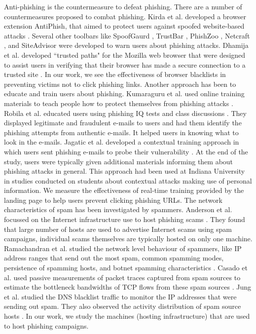 \documentclass[conference]{IEEEtran}
\begin{document}
\newline \indent
Anti-phishing is the countermeasure to defeat phishing. There are a number of countermeasures proposed to combat phishing. Kirda et al. developed a browser extension AntiPhish, that aimed to protect users against spoofed website-based attacks \cite{kirda}. Several other toolbars like SpoofGaurd \cite{chou}, TrustBar  \cite{herzberg}, PhishZoo \cite{afroz}, Netcraft \cite{netcraft}, and SiteAdvisor \cite{siteadvisor} were developed to warn users about phishing attacks. Dhamija et al. developed ``trusted paths" for the Mozilla web browser that were designed to assist users in verifying that their browser has made a secure connection to a trusted site \cite{dhamijatygar}. In our work, we see the effectiveness of browser blacklists in preventing victims not to click phishing links.
\newline\indent
 Another approach has been to educate and train users about phishing. Kumaraguru et al. used online training materials to teach people how to protect themselves from phishing attacks \cite{pk-404}. Robila et al. educated users using phishing IQ tests and class discussions \cite{robila}. They displayed legitimate and fraudulent e-mails to users and had them identify the phishing attempts from authentic e-mails. It helped users in knowing what to look in the e-mails. Jagatic et al. developed a contextual training approach in which users sent phishing e-mails to probe their vulnerability \cite{jagatic}. At the end of the study, users were typically given additional materials informing them about phishing attacks in general. This approach had been used at Indiana University in studies conducted on students about contextual attacks making use of personal information. We measure the effectiveness of real-time training provided by the landing page to help users prevent clicking phishing URLs.
\newline\indent
The network characteristics of spam has been investigated by spammers. Anderson et al. focussed on the Internet infrastructure use to host phishing scams \cite{anderson}. They found that large number of hosts are used to advertise Internet scams using spam campaigns, individual scams themselves are typically hosted on only one machine. Ramachandran et al. studied the network level behaviour of spammers, like IP address ranges that send out the most spam, common spamming modes, persistence of spamming hosts, and botnet spamming characteristics \cite{ramachandran}. Casado et al. used passive measurements of packet traces captured from spam sources to estimate the bottleneck bandwidths of TCP flows from these spam sources \cite{casado}. Jung et al. studied the DNS blacklist traffic to monitor the IP addresses that were sending out spam. They also observed the activity distribution of spam source hosts \cite{jung}. In our work, we study the machines (hosting infrastructure) that are used to host phishing campaigns.
\end{document}
